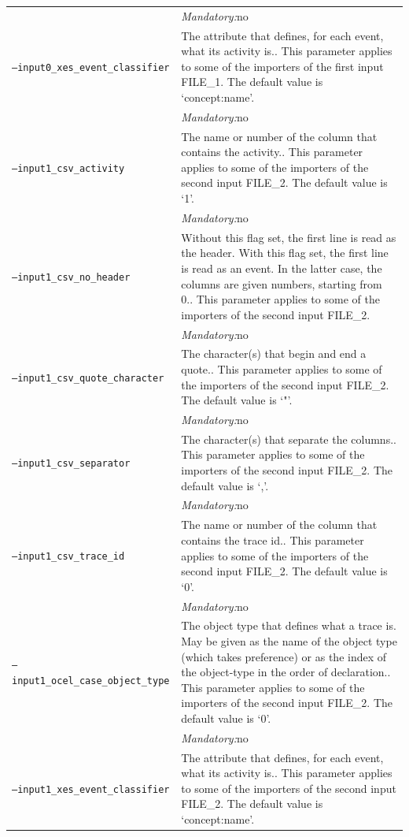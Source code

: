{\begin{tabularx}{\linewidth}{lX}
&\textit{Mandatory:}\quad no\\
\texttt{--input0\_xes\_event\_classifier} & The attribute that defines, for each event, what its activity is.. This parameter applies to some of the importers of the first input FILE\_1. The default value is `concept:name'.\\
&\textit{Mandatory:}\quad no\\
\texttt{--input1\_csv\_activity} & The name or number of the column that contains the activity.. This parameter applies to some of the importers of the second input FILE\_2. The default value is `1'.\\
&\textit{Mandatory:}\quad no\\
\texttt{--input1\_csv\_no\_header} & Without this flag set, the first line is read as the header. 
    With this flag set, the first line is read as an event. In the latter case, the columns are given numbers, starting from 0.. This parameter applies to some of the importers of the second input FILE\_2. \\
&\textit{Mandatory:}\quad no\\
\texttt{--input1\_csv\_quote\_character} & The character(s) that begin and end a quote.. This parameter applies to some of the importers of the second input FILE\_2. The default value is `"'.\\
&\textit{Mandatory:}\quad no\\
\texttt{--input1\_csv\_separator} & The character(s) that separate the columns.. This parameter applies to some of the importers of the second input FILE\_2. The default value is `,'.\\
&\textit{Mandatory:}\quad no\\
\texttt{--input1\_csv\_trace\_id} & The name or number of the column that contains the trace id.. This parameter applies to some of the importers of the second input FILE\_2. The default value is `0'.\\
&\textit{Mandatory:}\quad no\\
\texttt{--input1\_ocel\_case\_object\_type} & The object type that defines what a trace is. May be given as the name of the object type (which takes preference) or as the index of the object-type in the order of declaration.. This parameter applies to some of the importers of the second input FILE\_2. The default value is `0'.\\
&\textit{Mandatory:}\quad no\\
\texttt{--input1\_xes\_event\_classifier} & The attribute that defines, for each event, what its activity is.. This parameter applies to some of the importers of the second input FILE\_2. The default value is `concept:name'.\\

\end{tabularx}}
